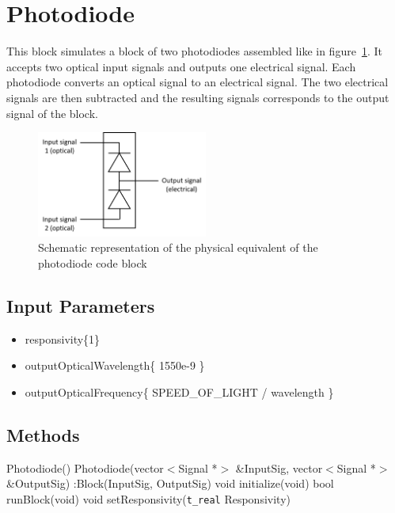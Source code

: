 \clearpage

\section{Photodiode}

This block simulates a block of two photodiodes assembled like in figure~\ref{photodiode}. It accepts two optical input signals and outputs one electrical signal. Each photodiode converts an optical signal to an electrical signal. The two electrical signals are then subtracted and the resulting signals corresponds to the output signal of the block.

\begin{figure}[h]
	\centering\includegraphics[width=0.5\textwidth]{../homodyne_receiver/figures/photodiode.png}
	\caption{Schematic representation of the physical equivalent of the photodiode code block}\label{photodiode}
\end{figure}

\subsection*{Input Parameters}

\begin{itemize}
	\item responsivity\{1\}
	\item outputOpticalWavelength\{ 1550e-9 \}
	\item outputOpticalFrequency\{ SPEED\_OF\_LIGHT / wavelength \}
\end{itemize}

\subsection*{Methods}
 
Photodiode() {}
\bigbreak
Photodiode(vector$<$Signal *$>$ \&InputSig, vector$<$Signal *$>$ \&OutputSig) :Block(InputSig, OutputSig) {}
\bigbreak
void initialize(void)
\bigbreak
bool runBlock(void)
\bigbreak
void setResponsivity(\texttt{t\_real} Responsivity)

